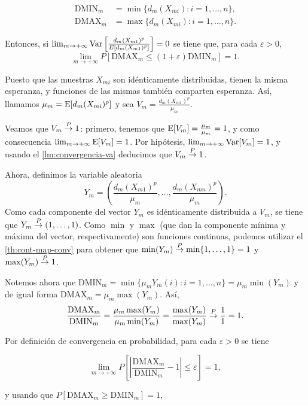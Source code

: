 \begin{align*}
  \mathrm{DMIN}_{m}&=\min\{d_m(X_{mi}):i=1,\dots,n\},\\
  \mathrm{DMAX}_{m}&=\max\{d_m(X_{mi}):i=1,\dots,n\}.
\end{align*}

Entonces, si
\(\lim_{m\rightarrow +\infty}\mathrm{Var}\left[\frac{d_m(X_{m1})^p}{E[d_m(X_{m1})^p]}\right]=0\)
se tiene que, para cada \(\varepsilon > 0\),
\[\lim_{m\rightarrow +\infty}P\left[\mathrm{DMAX}_m\leq (1+\varepsilon) \mathrm{DMIN}_m\right]=1.\]
\proofb

Puesto que las muestras \(X_{mi}\) son idénticamente distribuidas,
tienen la misma esperanza, y funciones de las mismas también comparten
esperanza. Así, llamamos \(\mu_m = \mathrm{E}[d_m(X_{mi})^p]\) y sea
\(V_m =\frac{d_m(X_{m1})^p}{\mu_m}\).

Veamos que \(V_m\overset{P}{\rightarrow} 1\): primero, tenemos que
\(\mathrm{E}[V_m] = \frac{\mu_m}{\mu_m} = 1\), y como consecuencia
\(\lim_{m\rightarrow +\infty}\mathrm{E}[V_m] = 1\). Por hipótesis,
\(\lim_{m\rightarrow +\infty}\mathrm{Var}[V_m] = 1\), y usando el
\autoref{lm:convergencia-va} deducimos que \(V_m\overset{P}{\rightarrow} 1\).

Ahora, definimos la variable aleatoria
\[Y_m=\left(\frac{d_m(X_{m1})^p}{\mu_m}, \dots, \frac{d_m(X_{mn})^p}{\mu_m}\right).\]
Como cada componente del vector \(Y_m\) es idénticamente distribuida a
\(V_m\), se tiene que \(Y_m\overset{P}{\rightarrow} (1, \dots, 1)\). Como \(\min\) y
\(\max\) (que dan la componente mínima y máxima del vector,
respectivamente) son funciones continuas, podemos utilizar el \autoref{th:cont-map-conv} para obtener que
\(\min(Y_m)\overset{P}{\rightarrow} \min\{1, \dots, 1\} = 1\) y \(\max(Y_m)\overset{P}{\rightarrow} 1\).

Notemos ahora que
\(\mathrm{DMIN}_m= \min\{\mu_m Y_m(i):i=1,\dots,n\}=\mu_m \min(Y_m)\) y
de igual forma \(\mathrm{DMAX}_m=\mu_m \max(Y_m)\). Así,
\[ \frac{\mathrm{DMAX}_m}{\mathrm{DMIN}_m}=\frac{\mu_m \max(Y_m)}{\mu_m \min(Y_m)}=\frac{\max(Y_m)}{\max(Y_m)}\overset{P}{\rightarrow} \frac 1 1= 1.\]

Por definición de convergencia en probabilidad, para cada
\(\varepsilon>0\) se tiene

\begin{equation}
  \label{eq:conv-dmax-dmin}
  \lim_{m\rightarrow +\infty} P\left[\left\lvert \frac{\mathrm{DMAX}_m}{\mathrm{DMIN}_m} - 1 \right\rvert\leq\varepsilon\right] = 1,
  \end{equation}

y usando que \(P\left[\mathrm{DMAX}_m \geq \mathrm{DMIN}_m \right]=1\),


